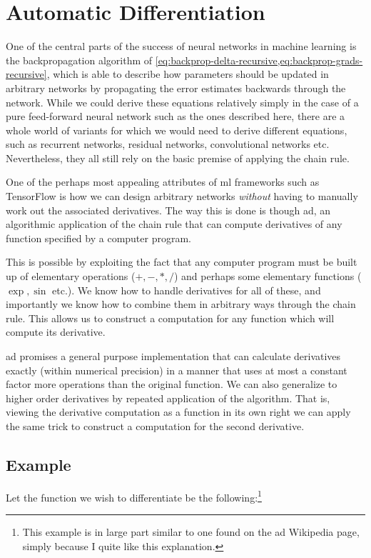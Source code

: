 \documentclass[Thesis.tex]{subfiles}
\begin{document}
\chapter{Automatic Differentiation}
\label{chp:auto-diff}

One of the central parts of the success of neural networks in machine learning
is the backpropagation algorithm of
\cref{eq:backprop-delta-recursive,eq:backprop-grads-recursive}, which is able to
describe how parameters should be updated in arbitrary networks by propagating
the error estimates backwards through the network. While we could derive these
equations relatively simply in the case of a pure feed-forward neural network
such as the ones described here, there are a whole world of variants for which
we would need to derive different equations, such as recurrent networks,
residual networks, convolutional networks etc. Nevertheless, they all still rely
on the basic premise of applying the chain rule.

One of the perhaps most appealing attributes of \gls{ml} frameworks such as TensorFlow
is how we can design arbitrary networks \emph{without} having to manually work
out the associated derivatives. The way this is done is though \gls{ad}, an
algorithmic application of the chain rule that can compute derivatives of any
function specified by a computer program.

This is possible by exploiting the fact that any computer program must be built
up of elementary operations (\(+,-,*,/\)) and perhaps some elementary functions
(\(\exp, \sin\) etc.). We know how to handle derivatives for all of these, and
importantly we know how to combine them in arbitrary ways through the chain
rule. This allows us to construct a computation for any function which
will compute its derivative.

\Gls{ad} promises a general purpose implementation that can
calculate derivatives exactly (within numerical precision) in a manner that uses
at most a constant factor more operations than the original function. We can
also generalize to higher order derivatives by repeated application of the
algorithm. That is, viewing the derivative computation as a function in its own
right we can apply the same trick to construct a computation for the second
derivative.


\section{Example}

Let the function we wish to differentiate be the following:\footnote{This example is in large part similar to one found
    on the \gls{ad} Wikipedia page, simply because I quite like this explanation.}
\end{document}
